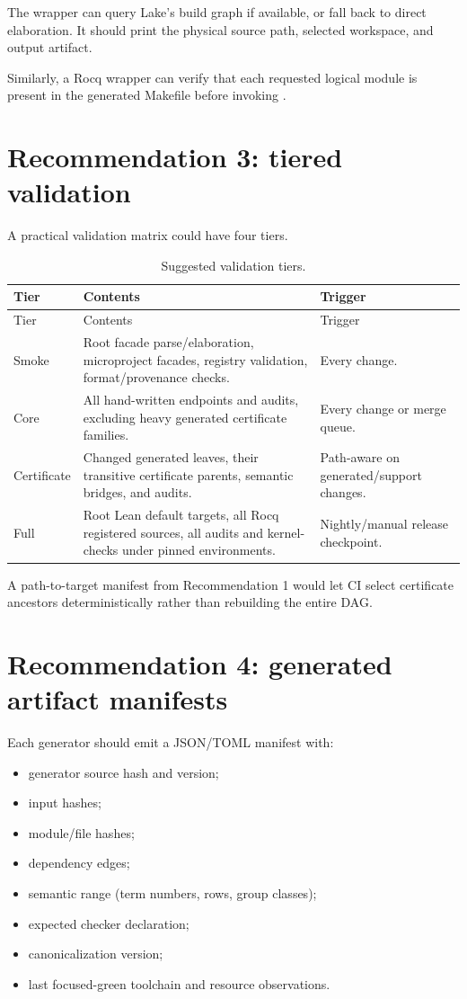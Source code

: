 \documentclass[
  10pt,
  a4paper,
  twoside,
  open=any,
  parskip=half,
  headings=big
]{scrreprt}
\newcommand{\code}[1]{\texttt{\detokenize{#1}}}
\begin{document}
The wrapper can query Lake's build graph if available, or fall back to direct
\code{lake env lean} elaboration.  It should print the physical source path,
selected workspace, and output artifact.

Similarly, a Rocq wrapper can verify that each requested logical module is
present in the generated Makefile before invoking \code{make}.

\section{Recommendation 3: tiered validation}

A practical validation matrix could have four tiers.

\begin{longtable}{L{.17\textwidth}L{.35\textwidth}L{.37\textwidth}}
\caption{Suggested validation tiers.}
\label{tab:validation-tiers}\\
\toprule
Tier & Contents & Trigger \\
\midrule
\endfirsthead
\toprule
Tier & Contents & Trigger \\
\midrule
\endhead
Smoke &
Root facade parse/elaboration, microproject facades, registry validation,
format/provenance checks. &
Every change.\\
Core &
All hand-written endpoints and audits, excluding heavy generated certificate
families. &
Every change or merge queue.\\
Certificate &
Changed generated leaves, their transitive certificate parents, semantic
bridges, and audits. &
Path-aware on generated/support changes.\\
Full &
Root Lean default targets, all Rocq registered sources, all audits and
kernel-checks under pinned environments. &
Nightly/manual release checkpoint.\\
\bottomrule
\end{longtable}

A path-to-target manifest from Recommendation 1 would let CI select
certificate ancestors deterministically rather than rebuilding the entire
DAG.

\section{Recommendation 4: generated artifact manifests}

Each generator should emit a JSON/TOML manifest with:

\begin{itemize}
  \item generator source hash and version;
  \item input hashes;
  \item module/file hashes;
  \item dependency edges;
  \item semantic range (term numbers, rows, group classes);
  \item expected checker declaration;
  \item canonicalization version;
  \item last focused-green toolchain and resource observations.
\end{itemize}
\end{document}
